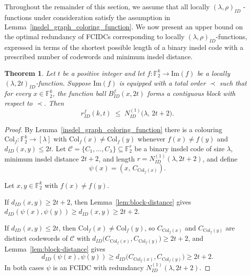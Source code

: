 \documentclass[11 pt]{article}
\numberwithin{equation}{section}
\newtheorem{theorem}{Theorem}[section]
\begin{document}
  
    Throughout the remainder of this section, we assume that all locally $(\lambda, \rho)_{ID}$ -functions under consideration satisfy the assumption in Lemma~\ref{insdel_graph_coloring_function}.
    We now present an upper bound on the optimal redundancy of FCIDCs corresponding to locally $(\lambda, \rho)_{ID}$-functions, expressed in terms of the shortest possible length of a binary insdel code with a prescribed number of codewords and minimum insdel distance.
    
    

    \begin{theorem}\label{thm:local_redu_upper}
    Let $t$ be a positive integer and let $f: \mathbb{F}_2^k \rightarrow \mathrm{Im}(f)$ be a locally $(\lambda, 2t)_{ID}$-function. Suppose $\mathrm{Im}(f)$ is equipped with a total order $\prec$ such that for every $x \in \mathbb{F}_2^k$, the function ball
    $B^{f}_{ID}(x, 2t)$ forms a contiguous block with respect to $\prec$. Then
    \[
    r^{f}_{ID}(k, t) \;\leq\; N^{(1)}_{ID}\!\big(\lambda,\, 2t+2\big).
    \]
    \end{theorem}

    \begin{proof}
    By Lemma~\ref{insdel_graph_coloring_function} there is a colouring $\mathrm{Col}_f : \mathbb{F}_2^k \to [\lambda]$ with
    $\mathrm{Col}_f(x) \neq \mathrm{Col}_f(y)$ whenever $f(x)\neq f(y)$ and $d_{ID}(x,y)\leq 2t$. Let $\mathcal{C}=\{C_1,\dots,C_\lambda\}\subseteq \mathbb{F}_2^{r}$ be a binary insdel code of size $\lambda$, minimum insdel
    distance $2t+2$, and length $r = N^{(1)}_{ID}(\lambda, 2t+2)$, and define
    $$\psi(x) = (x,\,C_{\mathrm{Col}_f(x)}).$$
    
    \noindent Let $x,y\in\mathbb{F}_2^k$ with $f(x)\neq f(y)$. 
    
    \noindent If $d_{ID}(x,y)\geq 2t+2$, then Lemma~\ref{lem:block-distance} gives $d_{ID}(\psi(x),\psi(y)) \geq d_{ID}(x,y) \geq 2t+2$.

    \noindent If $d_{ID}(x,y)\leq 2t$, then $\mathrm{Col}_f(x)\neq\mathrm{Col}_f(y)$, so $C_{\mathrm{Col}_f(x)}$ and $C_{\mathrm{Col}_f(y)}$ are distinct codewords of $\mathcal{C}$ with $d_{ID}\big(C_{\mathrm{Col}_f(x)},C_{\mathrm{Col}_f(y)}\big)\geq 2t+2$,
    and Lemma~\ref{lem:block-distance} gives 
    \[
    d_{ID}(\psi(x),\psi(y)) \geq d_{ID}\big(C_{\mathrm{Col}_f(x)},C_{\mathrm{Col}_f(y)}\big)\geq 2t+2.
    \]
    \noindent In both cases $\psi$ is an FCIDC with redundancy $N^{(1)}_{ID}(\lambda, 2t+2)$.
    \end{proof}
    
\end{document}
